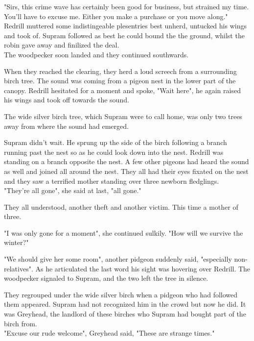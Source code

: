 \documentclass[smalldemyvopaper,11pt,twoside,onecolumn,openright,extrafontsizes]{memoir}
\begin{document}
"Sirs, this crime wave has certainly been good for business, but strained my time. You'll have to excuse me. Either you make a purchase or you move along."\\

Redrill muttered some indistingeable plesentries best unherd, untucked his wings and took of. Supram followed as best he could bound the the ground, whilst the robin gave away and finilized the deal.\\

The woodpecker soon landed and they continued southwards. 

When they reached the clearing, they herd a loud screech from a surrounding birch tree. The sound was coming from a pigeon nest in the lower part of the canopy. Redrill hesitated for a moment and spoke, "Wait here", he again raised his wings and took off towards the sound. 

The wide silver birch tree, which Supram were to call home, was only two trees away from where the sound had emerged.

Supram didn't wait. He sprung up the side of the birch following a branch running past the nest so as he could look down into the nest. Redrill was standing on a branch opposite the nest. A few other pigeons had heard the sound as well and joined all around the nest. They all had their eyes fixated on the nest and they saw a terrified mother standing over three newborn fledglings.\\

"They're all gone", she said at last, "all gone."

They all understood, another theft and another victim. This time a mother of three. 

"I was only gone for a moment", she continued sulkily. "How will we survive the winter?"

"We should give her some room", another pidgeon suddenly said, "especially non-relatives". As he articulated the last word his sight was hovering over Redrill. The woodpecker signaled to Supram, and the two left the tree in silence.

They regrouped under the wide silver birch when a pidgeon who had followed them appeared. Supram had not recognized him in the crowd but now he did. It was Greyhead, the landlord of these birches who Supram had bought part of the birch from. \\

"Excuse our rude welcome", Greyhead said, "These are strange times."\\
\end{document}

